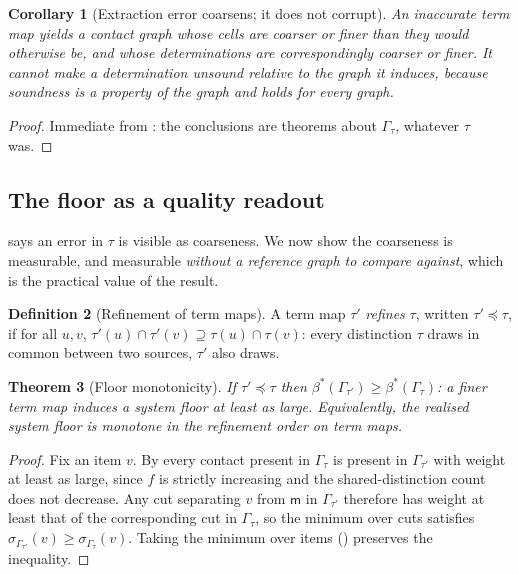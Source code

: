 \documentclass[11pt,twocolumn,a4paper]{article}
\theoremstyle{dirthm}
\newtheorem{theorem}{Theorem}[section]
\newtheorem{corollary}[theorem]{Corollary}
\theoremstyle{definition}
\newtheorem{definition}[theorem]{Definition}
\theoremstyle{remark}
\newcommand{\Gph}{\Gamma}
\newcommand{\med}{\mathsf{m}}
\newcommand{\flo}{\beta}
\newcommand{\str}{\sigma}
\newcommand{\terms}{\tau}
\begin{document}
\begin{corollary}[Extraction error coarsens; it does not corrupt]
\label{cor:coarsen}
An inaccurate term map yields a contact graph whose cells are coarser or
finer than they would otherwise be, and whose determinations are
correspondingly coarser or finer. It cannot make a determination unsound
relative to the graph it induces, because soundness is a property of the
graph and  holds for every graph.
\end{corollary}

\begin{proof}
Immediate from : the conclusions are theorems about
$\Gph_\terms$, whatever $\terms$ was.
\end{proof}

\subsection{The floor as a quality readout}

 says an error in $\terms$ is visible as coarseness. We now
show the coarseness is measurable, and measurable \emph{without a reference
graph to compare against}, which is the practical value of the result.

\begin{definition}[Refinement of term maps]
\label{def:refinement}
A term map $\terms'$ \emph{refines} $\terms$, written
$\terms'\preceq\terms$, if for all $u,v$,
$\terms'(u)\cap\terms'(v)\supseteq\terms(u)\cap\terms(v)$: every distinction
$\terms$ draws in common between two sources, $\terms'$ also draws.
\end{definition}

\begin{theorem}[Floor monotonicity]
\label{thm:floor-readout}
If $\terms'\preceq\terms$ then $\flo^{\ast}(\Gph_{\terms'})\ge
\flo^{\ast}(\Gph_{\terms})$: a finer term map induces a system floor at least
as large. Equivalently, the realised system floor is monotone in the
refinement order on term maps.
\end{theorem}

\begin{proof}
Fix an item $v$. By  every contact present in
$\Gph_\terms$ is present in $\Gph_{\terms'}$ with weight at least as large,
since $f$ is strictly increasing and the shared-distinction count does not
decrease. Any cut separating $v$ from $\med$ in $\Gph_{\terms'}$ therefore has
weight at least that of the corresponding cut in $\Gph_\terms$, so the minimum
over cuts satisfies $\str_{\Gph_{\terms'}}(v)\ge\str_{\Gph_\terms}(v)$.
Taking the minimum over items () preserves the
inequality.
\end{proof}
\end{document}
